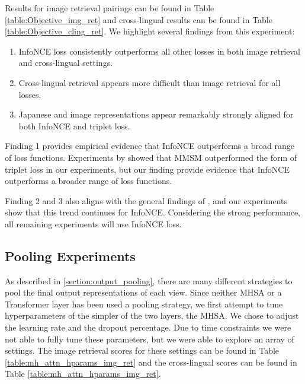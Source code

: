 


Results for image retrieval pairings can be found in Table \ref{table:Objective_img_ret} and cross-lingual results can be found in Table \ref{table:Objective_cling_ret}.
We highlight several findings from this experiment:
\begin{enumerate}
    \item InfoNCE loss consistently outperforms all other losses in both image retrieval and cross-lingual settings.
    \item Cross-lingual retrieval appears more difficult than image retrieval for all losses.
    \item Japanese and image representations appear remarkably strongly aligned for both InfoNCE and triplet loss.
\end{enumerate}

Finding 1
provides empirical evidence that InfoNCE outperforms a broad range of loss functions.
Experiments by \cite{ohishi2020trilingual} showed that MMSM outperformed the form of triplet loss in our experiments, but our finding provide evidence that InfoNCE outperforms a broader range of loss functions.


Finding 2 and 3 also aligns with the general findings of \cite{ohishi2020trilingual}, and our experiments show that this trend continues for InfoNCE.
Considering the strong performance, all remaining experiments will use InfoNCE loss.

\subsection{Pooling Experiments}
\label{section:pooling_experiments}



As described in \ref{section:output_pooling}, there are many different strategies to pool the final output representations of each view.
Since neither MHSA or a Transformer layer has been used a pooling strategy, we first attempt to tune hyperparameters of the simpler of the two layers, the MHSA.
We chose to adjust the learning rate and the dropout percentage.
Due to time constraints we were not able to fully tune these parameters, but we were able to explore an array of settings. 
The image retrieval scores for these settings can be found in Table \ref{table:mh_attn_hparams_img_ret} and the cross-lingual scores can be found in Table \ref{table:mh_attn_hparams_img_ret}.

